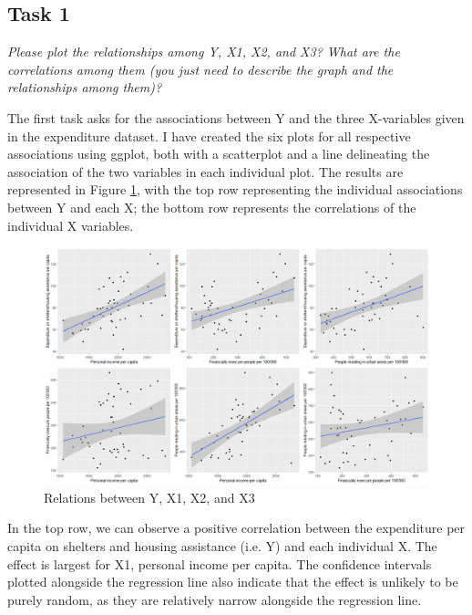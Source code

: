 \documentclass[12pt,a4paper]{article}
\begin{document}
\subsection{Task 1}
\textit{Please plot the relationships among \emph{Y}, \emph{X1}, \emph{X2}, and \emph{X3}? What are the correlations among them (you just need to describe the graph and the relationships among them)?}
\vspace{0.5cm}

The first task asks for the associations between Y and the three X-variables given in the expenditure dataset. I have created the six plots for all respective associations using ggplot, both with a scatterplot and a line delineating the association of the two variables in each individual plot. The results are represented in Figure \ref{fig:refplot}, with the top row representing the individual associations between Y and each X; the bottom row represents the correlations of the individual X variables.



\begin{figure}[h]
	\centering
	\includegraphics[width=\textwidth]{PS1_Plot1}
	\caption{Relations between Y, X1, X2, and X3}
	\label{fig:refplot}
\end{figure}

In the top row, we can observe a positive correlation between the expenditure per capita on shelters and housing assistance (i.e. Y) and each individual X. The effect is largest for X1, personal income per capita. The confidence intervals plotted alongside the regression line also indicate that the effect is unlikely to be purely random, as they are relatively narrow alongside the regression line.
\end{document}
